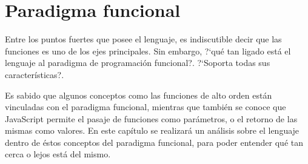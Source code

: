 \chapter{Paradigma funcional}

\label{ch:pf}


Entre los puntos fuertes que posee el lenguaje, es indiscutible decir que las funciones es uno de los ejes principales. Sin embargo, ?`qué tan ligado está el lenguaje al paradigma de programación funcional?. ?`Soporta todas sus características?.

Es sabido que algunos conceptos como las funciones de alto orden están vinculadas con el paradigma funcional, mientras que también se conoce que JavaScript permite el pasaje de funciones como parámetros, o el retorno de las mismas como valores. En este capítulo se realizará un análisis sobre el lenguaje dentro de éstos conceptos del paradigma funcional, para poder entender qué tan cerca o lejos está del mismo.








